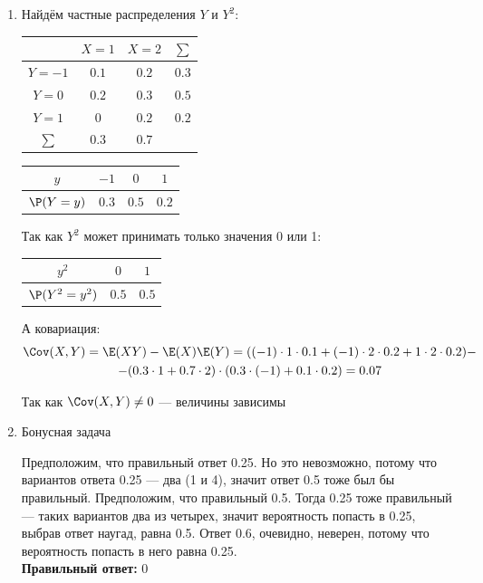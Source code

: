 \begin{enumerate}
\item Найдём частные распределения $Y$ и $Y^2$:
\begin{center}
\begin{tabular}{cccc}
\toprule
 & $X=1$ & $X=2$ & $\sum$ \\ \midrule
$Y=-1$ & $0.1$ & $0.2$ & $0.3$ \\
$Y=0$ & $0.2$ & $0.3$ & $0.5$ \\
$Y=1$ & $0$ & $0.2$ & $0.2$ \\
$\sum$ & $0.3$ & $0.7$ & \\ \bottomrule
\end{tabular}
\end{center}

\begin{center}
\begin{tabular}{@{}cccc@{}}
\toprule
$y$         & $-1$             & $0$      & $1$         \\ \midrule
$\P(Y=y)$ & $0.3$ & $0.5$  & $0.2$\\ \bottomrule
\end{tabular}
\end{center}

Так как $Y^2$ может принимать только значения 0 или 1:

\begin{center}
\begin{tabular}{@{}ccc@{}}
\toprule
$y^2$         & $0$             & $1$               \\ \midrule
$\P(Y^2 = y^2)$ & $0.5$ & $0.5$ \\ \bottomrule
\end{tabular}
\end{center}
А ковариация:
 \begin{multline*}
 \Cov(X, Y) = \E(XY) - \E(X)\E(Y) =
 ((-1)\cdot 1\cdot0.1 + (-1)\cdot2 \cdot 0.2 + 1\cdot2\cdot 0.2) -\\
 - (0.3\cdot1 + 0.7 \cdot 2)\cdot(0.3\cdot(-1) + 0.1\cdot 0.2) = 0.07
\end{multline*}

Так как $\Cov(X, Y) \ne 0$ — величины зависимы

\item Бонусная задача

Предположим, что правильный ответ 0.25. Но это невозможно, потому что вариантов ответа 0.25 — два (1 и 4), значит ответ 0.5 тоже был бы правильный. Предположим, что правильный 0.5. Тогда 0.25 тоже правильный — таких вариантов два из четырех, значит вероятность попасть в 0.25, выбрав ответ наугад, равна 0.5. Ответ 0.6, очевидно, неверен, потому что вероятность попасть в него равна 0.25. \\
\textbf{Правильный ответ:} 0
\end{enumerate}



